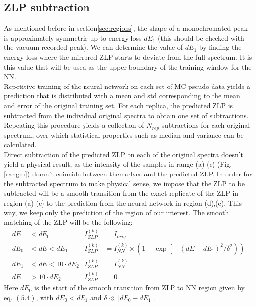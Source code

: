 \documentclass[11pt,a4paper]{article}
\numberwithin{equation}{section}
\numberwithin{figure}{section}
\numberwithin{table}{section}
\begin{document}
\subsection{ZLP subtraction}\label{sec:subtraction}

As mentioned before in section\ref{sec:regions}, the shape of a monochromated peak is approximately symmetric up to energy loss $dE_1$ (this should be checked with the vacuum recorded peak). We can determine the value of $dE_1$ by finding the energy loss where the mirrored ZLP starts to deviate from the full spectrum. It is this value that will be used as the upper boundary of the training window for the NN. \\

Repetitive training of the neural network on each set of MC pseudo data yields a prediction that is distributed with a mean and std corresponding to the mean and error of the original training set. For each replica, the predicted ZLP is subtracted from the individual original spectra to obtain one set of subtractions. Repeating this procedure yields a collection of $N_{rep}$ subtractions for each original spectrum, over which statistical properties such as median and variance can be calculated. \\

Direct subtraction of the predicted ZLP on each of the original spectra doesn't yield a physical result, as the intensity of the samples in range (a)-(c) (Fig. \ref{ranges}) doesn't coincide between themselves and the predicted ZLP. In order for the subtracted spectrum to make physical sense, we impose that the ZLP to be subtracted will be a smooth transition from the exact replicate of the ZLP in region (a)-(c) to the prediction from the neural network in region (d),(e). This way, we keep only the prediction of the region of our interest. The smooth matching of the ZLP will be the following:
\begin{align}
 dE &< dE_0          &   I_{ZLP}^{(k)} &= I_{orig}\\
 dE_0 &< dE < dE_1   &  I_{ZLP}^{(k)} &= I_{NN}^{(k)} \times  \left( 1 - \exp(-(dE - dE_1)^2/\delta^2)\right) \\
 dE_1 &< dE < 10 \cdot dE_2 &  I_{ZLP}^{(k)} &= I_{NN}^{(k)}\\
 dE &> 10 \cdot dE_2 &   I_{ZLP}^{(k)} &= 0
\end{align}
Here $dE_0$ is the start of the smooth transition from ZLP to NN region given by eq. $(5.4)$, with $dE_0<dE_1$  and $\delta \ll |dE_0 - dE_1|$. 
\end{document}
